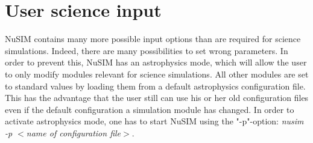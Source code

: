 \section{User science input}

NuSIM contains many more possible input options than are required for science simulations. 
Indeed, there are many possibilities to set wrong parameters.
In order to prevent this, NuSIM has an astrophysics mode, which will allow the user to only modify modules relevant for science simulations.
All other modules are set to standard values by loading them from a default astrophysics configuration file.
This has the advantage that the user still can use his or her old configuration files even if the default configuration a simulation module has changed.
In order to activate astrophysics mode, one has to start NuSIM using the "-p"-option: \emph{nusim -p $<$name of configuration file$>$}. 

